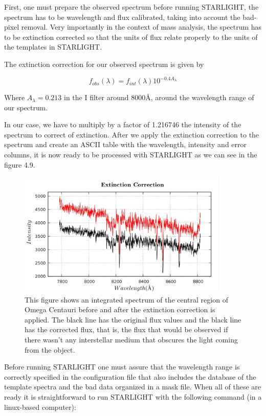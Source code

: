 First, one must prepare the observed spectrum before running STARLIGHT, the spectrum has to be wavelength and flux calibrated, taking into account the bad-pixel removal. Very importantly in the context of mass analysis, the spectrum has to be extinction corrected so that the units of flux relate properly to the units of the templates in STARLIGHT.     

The extinction correction for our observed spectrum is given by

\begin{equation}
f_{obs}(\lambda)=f_{int}(\lambda)10^{-0.4A_{\lambda}}
\end{equation}

Where $A_{\lambda}=0.213$ in the I filter around $8000 \textrm{\AA}$, around the wavelength range of our spectrum. 

In our case, we have to multiply by a factor of 1.216746 the intensity of the spectrum to correct of extinction. After we apply the extinction correction to the spectrum and create an ASCII table with the wavelength, intensity and error columns, it is now ready to be processed with STARLIGHT as we can see in the figure 4.9.

\begin{figure}[H]
\centering
\includegraphics[width=10cm]{images/extinction.png}
\caption[Extinction Correction]{This figure shows an integrated spectrum of the central region of Omega Centauri before and after the extinction correction is applied. The black line has the original flux values and the black line has the corrected flux, that is, the flux that would be observed if there wasn't any interstellar medium that obscures the light coming from the object.}
\end{figure}

Before running STARLIGHT one must assure that the wavelength range is correctly specified in the configuration file that also includes the database of the template spectra and the bad data organized in a mask file. When all of these are ready it is straightforward to run STARLIGHT with the following command (in a linux-based computer):

